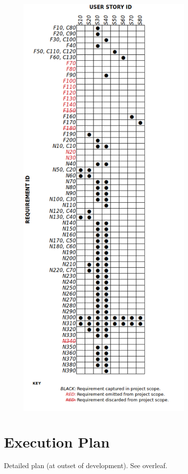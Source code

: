 \begin{figure}[h!]
	\centering
	\includegraphics[height=22cm]{images/coverage_matrix.png}
\end{figure}

\section{Execution Plan}\label{appendix_execution_plan}

Detailed plan (at outset of development). See overleaf.


